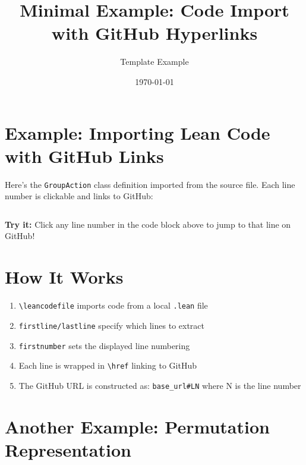 \documentclass{article}
\newcommand{\leancodeurl}{}
\newcommand{\setleancodeurl}[1]{\renewcommand{\leancodeurl}{#1}}
\newcommand{\leancodefile}[3][]{%
  \setleancodeurl{#3}%
  \inputminted[fontsize=\footnotesize,breaklines,breakanywhere,tabsize=2,showspaces=false,linenos=true,#1]{lean4}{#2}%
}
\begin{document}
\title{Minimal Example: Code Import with GitHub Hyperlinks}
\author{Template Example}
\date{\today}
\maketitle

\section{Example: Importing Lean Code with GitHub Links}

Here's the \texttt{GroupAction} class definition imported from the source file.
Each line number is clickable and links to GitHub:

\leancodefile[
firstline=20,
lastline=23,
firstnumber=20
]{../lean/GroupAction/Defs.lean}{https://github.com/FrankieeW/GroupAction/blob/v1.0.0/lean/GroupAction/Defs.lean}

\textbf{Try it:} Click any line number in the code block above to jump to that line on GitHub!

\section{How It Works}

\begin{enumerate}
	\item \texttt{\textbackslash leancodefile} imports code from a local \texttt{.lean} file
	\item \texttt{firstline/lastline} specify which lines to extract
	\item \texttt{firstnumber} sets the displayed line numbering
	\item Each line is wrapped in \texttt{\textbackslash href} linking to GitHub
	\item The GitHub URL is constructed as: \texttt{base\_url\#LN} where N is the line number
\end{enumerate}

\section{Another Example: Permutation Representation}

\leancodefile[
firstline=66,
lastline=69,
firstnumber=66
]{../lean/GroupAction/Permutation.lean}{https://github.com/FrankieeW/GroupAction/blob/v1.0.0/lean/GroupAction/Permutation.lean}
\end{document}
